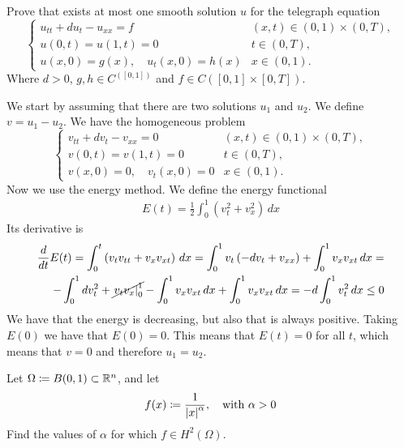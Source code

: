 \newpage

\begin{exercise}
    Prove that exists at most one smooth solution \(u\) for the telegraph equation
    \[
        \begin{cases}
            u_{tt} + d u_t - u_{xx} = f            & (x, t) \in (0,1) \times (0, T), \\
            u(0, t) = u(1, t) = 0                  & t \in (0, T),                   \\
            u(x, 0) = g(x), \quad u_t(x, 0) = h(x) & x \in (0, 1).
        \end{cases}
    \]
    Where \(d > 0\), \(g, h \in C^([0, 1])\) and \(f \in C([0, 1] \times [0, T])\).
\end{exercise}
We start by assuming that there are two solutions \(u_1\) and \(u_2\). We define \(v = u_1 - u_2\). We have the homogeneous problem
\[
    \begin{cases}
        v_{tt} + d v_t - v_{xx} = 0      & (x, t) \in (0,1) \times (0, T), \\
        v(0, t) = v(1, t) = 0            & t \in (0, T),                   \\
        v(x, 0) = 0, \quad v_t(x, 0) = 0 & x \in (0, 1).
    \end{cases}
\]
Now we use the energy method. We define the energy functional
\[
    \begin{split}
        E(t) = \frac{1}{2} \int_0^1 \left(v_t^2 + v_x^2\right) \, dx
    \end{split}
\]
Its derivative is
\[
    \begin{split}
        \frac{d}{dt} E(t) = \int_0^t \left(v_t v_{tt} + v_x v_{xt}\right) \, dx = \int_0^1 v_t\left(-d v_t + v_{xx}\right) + \int_0^1 v_x v_{xt} \, dx = \\
        -\int_0^1 d v_t^2 + \cancel{\left. v_t v_x \right|_0^1} - \int_0^1 v_x v_{xt} \, dx  + \int_0^1 v_x v_{xt} \, dx = -d \int_0^1 v_t^2 \, dx \leq 0
    \end{split}
\]
We have that the energy is decreasing, but also that is always positive. Taking
\(E(0)\) we have that \(E(0) = 0\). This means that \(E(t) = 0\) for all \(t\),
which means that \(v = 0\) and therefore \(u_1 = u_2\). \newpage
\begin{exercise}
    Let \(\Omega \coloneqq B(0, 1) \subset \mathbb{R}^n\), and let
    \[
        f(x) \coloneqq \frac{1}{\abs{x}^\alpha}, \quad \text{with } \alpha > 0
    \]
    Find the values of \(\alpha\) for which \(f \in H^2(\Omega)\).
\end{exercise}
